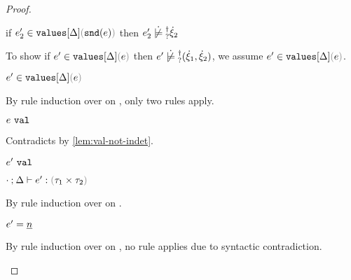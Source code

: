 \begin{proof}
\begin{byCases}
\begin{byCases}
\begin{byCases}
\begin{byCases}
\begin{byCases}
\begin{pfsteps*}
            \item if $\inValues{e_2'}{\Delta}{\hsnd{e}}$ then $\cnotsatisfyormay{e_2'}{\hxi_2}$  
            \end{pfsteps*} 
            To show if $\inValues{e'}{\Delta}{e}$ then $\cnotsatisfyormay{e'}{\cpair{\hxi_1}{\hxi_2}}$, we assume $\inValues{e'}{\Delta}{e}$.
            \begin{pfsteps*}
            \item $\inValues{e'}{\Delta}{e}$  
            \end{pfsteps*}
            By rule induction over  on , only two rules apply.
            \begin{byCases}
              \item[\text{(\ref{rule:IVVal})}]
              \begin{pfsteps*}
              \item $e ~\mathtt{val}$ 
              \end{pfsteps*} 
              Contradicts  by \autoref{lem:val-not-indet}.
              \item[\text{(\ref{rule:IVIndet})}] 
              \begin{pfsteps*}
              \item $e' ~\mathtt{val}$  
              \item $\hexptyp{\cdot}{\Delta}{e'}{\tprod{\tau_1}{\tau_2}}$  
              \end{pfsteps*}
              By rule induction over  on .
              \begin{byCases}
                \item[\text{(\ref{rule:VNum})}]
                \begin{pfsteps*}
                \item $e'=\underline{n}$ 
                \end{pfsteps*} 
                By rule induction over  on , no rule applies due to syntactic contradiction.
                \item[\text{(\ref{rule:VLam})}]

\end{byCases}
\end{byCases}
\end{byCases}
\end{byCases}
\end{byCases}
\end{byCases}
\end{byCases}
\end{proof}

